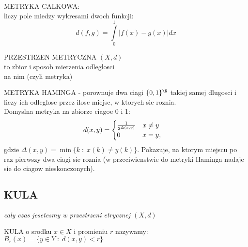 \documentclass{article}
\begin{document}
    \color{def}METRYKA CALKOWA:\color{txt}\medskip\\
    liczy pole miedzy wykresami dwoch funkcji:
        $$d(f,g)=\int\limits_0^1|f(x)-g(x)|dx$$
    \begin{center}\end{center}\bigskip

    \begin{center}\large
        \color{def}PRZESTRZEN METRYCZNA \color{txt}$(X, d)$\smallskip\\
        to zbior i sposob mierzenia odleglosci \\na nim (czyli metryka)
    \end{center}\bigskip

    \color{def}METRYKA HAMINGA \color{txt}- porownuje dwa ciagi $\{0,1\}^\N$ takiej samej dlugosci i liczy ich odleglosc przez ilosc miejsc, w ktorych sie roznia.\bigskip\\
    \color{def}Domyslna metryka na zbiorze ciagoe 0 i 1:\color{txt}
        $$d(x,y)=\begin{cases}{1\over 2^{\Delta(x,y)}}\quad x\neq y\\ 0\quad\quad\quad\; x=y,\end{cases}$$
    gdzie $\Delta(x,y) =\min \{k\;:\;x(k)\neq y(k)\}$. Pokazuje, na ktorym miejscu po raz pierwszy dwa ciagi sie roznia (w przeciwienstwie do metryki Haminga nadaje sie do ciagow nieskonczonych).

\subsection*{KULA}
    \begin{center}\emph{\color{emp}caly czas jesetesmy w przestrzeni etrycznej $(X,d)$}\end{center}
    \begin{center}\large
        \color{def}KULA \color{txt}o srodku $x\in X$ i promieniu $r$ nazywamy:\smallskip\\
        $B_r(x)=\{y\in Y\;:\;d(x,y)<r\}$
    \end{center}\bigskip
\end{document}
